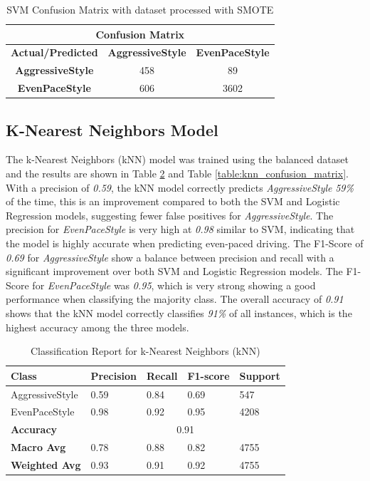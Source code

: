 \documentclass[10pt,journal,compsoc]{IEEEtran}
\begin{document}
\begin{table}[h]
    \centering
    \begin{tabular}{|c|c|c|}
    \hline
    \multicolumn{3}{|c|}{\textbf{Confusion Matrix}} \\
    \hline
    \textbf{Actual/Predicted} & \textbf{AggressiveStyle} & \textbf{EvenPaceStyle} \\ \hline
    \textbf{AggressiveStyle} & 458 & 89 \\ \hline
    \textbf{EvenPaceStyle} & 606 & 3602 \\ \hline
    \end{tabular}
    \caption{SVM Confusion Matrix with dataset processed with SMOTE}
    \label{table:confusion_matrix_smote}
\end{table}


\subsection{K-Nearest Neighbors Model}
The k-Nearest Neighbors (kNN) model was trained using the balanced dataset and the results are shown in Table \ref{table:knn_classification_report} and Table \ref{table:knn_confusion_matrix}.
With a precision of \textit{0.59}, the kNN model correctly predicts \textit{AggressiveStyle} \textit{59\%} of the time, this is an improvement compared to both the SVM and Logistic Regression models, 
suggesting fewer false positives for \textit{AggressiveStyle}. The precision for \textit{EvenPaceStyle} is very high at \textit{0.98} similar to SVM, indicating that the model is highly accurate when predicting even-paced driving.
The F1-Score of \textit{0.69} for \textit{AggressiveStyle} show a balance between precision and recall with a significant improvement over both SVM and Logistic Regression models. The F1-Score for \textit{EvenPaceStyle} 
was \textit{0.95}, which is very strong showing a good performance when classifying the majority class. The overall accuracy of \textit{0.91} shows that the kNN model correctly classifies \textit{91\%} of all instances, which is 
the highest accuracy among the three models.

\begin{table}[h]
    \centering    
    \begin{tabular}{|l|l|l|l|l|}
    \hline
    \textbf{Class} & \textbf{Precision} & \textbf{Recall} & \textbf{F1-score} & \textbf{Support} \\ \hline
    AggressiveStyle & 0.59 & 0.84 & 0.69 & 547 \\ \hline
    EvenPaceStyle & 0.98 & 0.92 & 0.95 & 4208 \\ \hline
    \textbf{Accuracy} & \multicolumn{4}{c|}{0.91} \\ \hline
    \textbf{Macro Avg} & 0.78 & 0.88 & 0.82 & 4755 \\ \hline
    \textbf{Weighted Avg} & 0.93 & 0.91 & 0.92 & 4755 \\ \hline
    \end{tabular}
    \caption{Classification Report for k-Nearest Neighbors (kNN)}
    \label{table:knn_classification_report}
\end{table}
\end{document}
